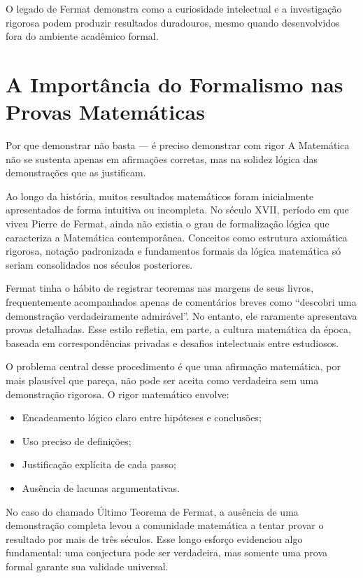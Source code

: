 \documentclass[12pt,a4paper,openright]{book}
\begin{document}
O legado de Fermat demonstra como a curiosidade intelectual e a investigação rigorosa podem produzir resultados duradouros, mesmo quando desenvolvidos fora do ambiente acadêmico formal.
\section{A Importância do Formalismo nas Provas Matemáticas}

\begin{block}{Por que demonstrar não basta — é preciso demonstrar com rigor}
A Matemática não se sustenta apenas em afirmações corretas, mas na solidez lógica das demonstrações que as justificam.
\end{block}

Ao longo da história, muitos resultados matemáticos foram inicialmente apresentados de forma intuitiva ou incompleta. No século XVII, período em que viveu Pierre de Fermat, ainda não existia o grau de formalização lógica que caracteriza a Matemática contemporânea. Conceitos como estrutura axiomática rigorosa, notação padronizada e fundamentos formais da lógica matemática só seriam consolidados nos séculos posteriores.

Fermat tinha o hábito de registrar teoremas nas margens de seus livros, frequentemente acompanhados apenas de comentários breves como “descobri uma demonstração verdadeiramente admirável”. No entanto, ele raramente apresentava provas detalhadas. Esse estilo refletia, em parte, a cultura matemática da época, baseada em correspondências privadas e desafios intelectuais entre estudiosos.

O problema central desse procedimento é que uma afirmação matemática, por mais plausível que pareça, não pode ser aceita como verdadeira sem uma demonstração rigorosa. O rigor matemático envolve:

\begin{itemize}
    \item Encadeamento lógico claro entre hipóteses e conclusões;
    \item Uso preciso de definições;
    \item Justificação explícita de cada passo;
    \item Ausência de lacunas argumentativas.
\end{itemize}

No caso do chamado Último Teorema de Fermat, a ausência de uma demonstração completa levou a comunidade matemática a tentar provar o resultado por mais de três séculos. Esse longo esforço evidenciou algo fundamental: uma conjectura pode ser verdadeira, mas somente uma prova formal garante sua validade universal.
\end{document}
